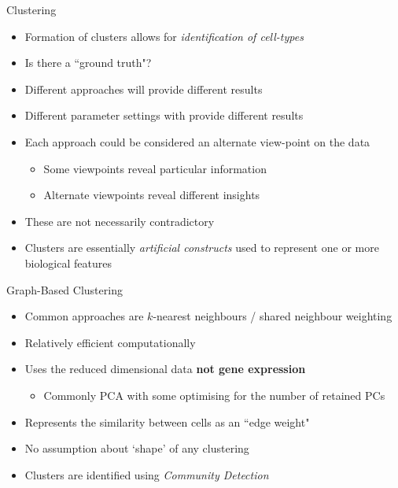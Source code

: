 \documentclass[aspectratio=169,11pt]{beamer}
\begin{document}
\begin{frame}{Clustering}

	\begin{itemize}
		\item Formation of clusters allows for \textit{identification of cell-types}
		\item Is there a ``ground truth"?
		\item Different approaches will provide different results
		\item Different parameter settings with provide different results
		\item Each approach could be considered an alternate view-point on the data
		\begin{itemize}
			\item Some viewpoints reveal particular information
			\item Alternate viewpoints reveal different insights
		\end{itemize}
		\item These are not necessarily contradictory
		\item Clusters are essentially \textit{artificial constructs} used to represent one or more biological features
	\end{itemize}
	
\end{frame}

\begin{frame}{Graph-Based Clustering}

	\begin{itemize}
		\item Common approaches are $k$-nearest neighbours / shared neighbour weighting
		\item Relatively efficient computationally
		\item Uses the reduced dimensional data \textbf{not gene expression}
		\begin{itemize}
			\item Commonly PCA with some optimising for the number of retained PCs
		\end{itemize}
		\item Represents the similarity between cells as an ``edge weight" 
		\item No assumption about `shape' of any clustering
		\item Clusters are identified using \textit{Community Detection}
	\end{itemize}

\end{frame}
\end{document}
